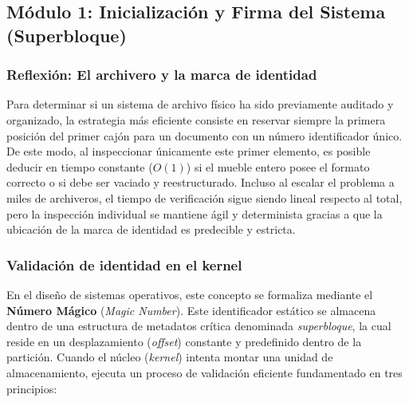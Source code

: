 \documentclass[12pt,letterpaper]{article}
\begin{document}
\subsection*{Módulo 1: Inicialización y Firma del Sistema (Superbloque)}

\subsubsection*{Reflexión: El archivero y la marca de identidad}
Para determinar si un sistema de archivo físico ha sido previamente auditado y organizado, la estrategia más
eficiente consiste en reservar siempre la primera posición del primer cajón para un documento con un número
identificador único. De este modo, al inspeccionar únicamente este primer elemento, es posible deducir en tiempo
constante ($O(1)$) si el mueble entero posee el formato correcto o si debe ser vaciado y reestructurado. Incluso
al escalar el problema a miles de archiveros, el tiempo de verificación sigue siendo lineal respecto al total,
pero la inspección individual se mantiene ágil y determinista gracias a que la ubicación de la marca de identidad
es predecible y estricta.

\subsubsection*{Validación de identidad en el kernel}
En el diseño de sistemas operativos, este concepto se formaliza mediante el \textbf{Número Mágico}
(\textit{Magic Number}). Este identificador estático se almacena dentro de una estructura de metadatos crítica
denominada \textit{superbloque}, la cual reside en un desplazamiento (\textit{offset}) constante y predefinido
dentro de la partición. Cuando el núcleo (\textit{kernel}) intenta montar una unidad de almacenamiento, ejecuta
un proceso de validación eficiente fundamentado en tres principios:
\end{document}
